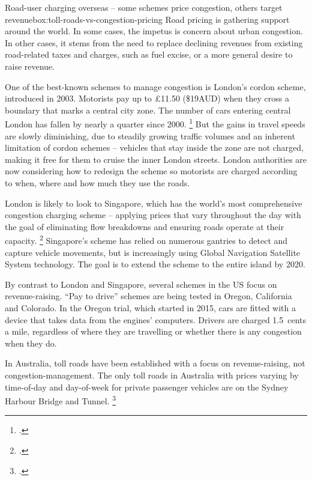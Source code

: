 \documentclass{grattan}
\begin{document}
\begin{bigbox*}{Road-user charging overseas -- some schemes price congestion, others target revenue}{box:toll-roads-vs-congestion-pricing}
Road pricing is gathering support around the world.
In some cases, the impetus is concern about urban congestion.
In other cases, it stems from the need to replace declining revenues from existing road-related taxes and charges, such as fuel excise, or a more general desire to raise revenue.


One of the best-known schemes to manage congestion is London's cordon scheme, introduced in 2003. Motorists pay up to £11.50 (\$19AUD) when they cross a boundary that marks a central city zone. The number of cars entering central London has fallen by nearly a quarter since 2000.%
	\footcite{TheEconomist-2017-Road-pricing-has-long-been-a-good-idea}
But the gains in travel speeds are slowly diminishing, due to steadily growing traffic volumes and an inherent limitation of cordon schemes -- vehicles that stay inside the zone are not charged, making it free for them to cruise the inner London streets.
London authorities are now considering how to redesign the scheme so motorists are charged according to when, where and how much they use the roads.

London is likely to look to Singapore, which has the world's most comprehensive congestion charging scheme -- applying prices that vary throughout the day with the goal of eliminating flow breakdowns and ensuring roads operate at their capacity.%
    \footcite[][22]{Wallis-Lupton-2013-NZ-Transport-Agency}
Singapore's scheme has relied on numerous gantries to detect and capture vehicle movements, but is increasingly using Global Navigation Satellite System technology.
The goal is to extend the scheme to the entire island by 2020.

By contrast to London and Singapore, several schemes in the US focus on revenue-raising.
``Pay to drive'' schemes are being tested in Oregon, California and Colorado.
In the Oregon trial, which started in 2015, cars are fitted with a device that takes data from the engines' computers.
Drivers are charged 1.5~cents a mile, regardless of where they are travelling or whether there is any congestion when they do.

In Australia, toll roads have been established with a focus on revenue-raising, not congestion-management.
The only toll roads in Australia with prices varying by time-of-day and day-of-week for private passenger vehicles are on the Sydney Harbour Bridge and Tunnel.
\footcite{BITRE-toll-roads-in-Australia}

\end{bigbox*}
\end{document}
